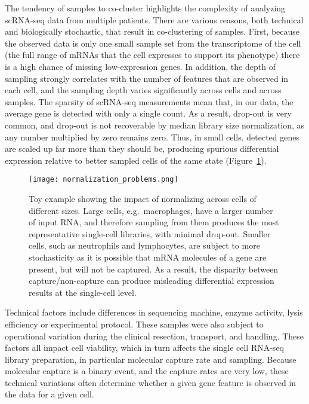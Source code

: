 The tendency of samples to co-cluster highlights the complexity of analyzing scRNA-seq data from multiple patients.
There are various reasons, both technical and biologically stochastic, that result in co-clustering of samples. 
First, because the observed data is only one small sample set from the transcriptome of the cell (the full range of mRNAs that the cell expresses to support its phenotype) there is a high chance of missing low-expression genes. 
In addition, the depth of sampling strongly correlates with the number of features that are observed in each cell, and the sampling depth varies significantly across cells and across samples. %
The sparsity of scRNA-seq measurements mean that, in our data, the average gene is detected with only a single count. 
As a result, drop-out is very common, and drop-out is not recoverable by median library size normalization, as any number multiplied by zero remains zero. 
Thus, in small cells, detected genes are scaled up far more than they should be, producing spurious differential expression relative to better sampled cells of the same state (Figure~\ref{fig:norm}).

\begin{figure}
\centering
\texttt{[image: normalization\_problems.png]}
\caption{Toy example showing the impact of normalizing across cells of different sizes. Large cells, e.g.\ macrophages, have a larger number of input RNA, and therefore sampling from them produces the most representative single-cell libraries, with minimal drop-out. Smaller cells, such as neutrophils and lymphocytes, are subject to more stochasticity as it is possible that mRNA molecules of a gene are present, but will not be captured. As a result, the disparity between capture/non-capture can produce misleading differential expression results at the single-cell level.}
\label{fig:norm}
\end{figure}

Technical factors include differences in sequencing machine, enzyme activity, lysis efficiency or experimental protocol. 
These samples were also subject to operational variation during the clinical resection, transport, and handling. These factors all impact cell viability, which in turn affects the single cell RNA-seq library preparation, in particular molecular capture rate and sampling. 
Because molecular capture is a binary event, and the capture rates are very low, these technical variations often determine whether a given gene feature is observed in the data for a given cell.

